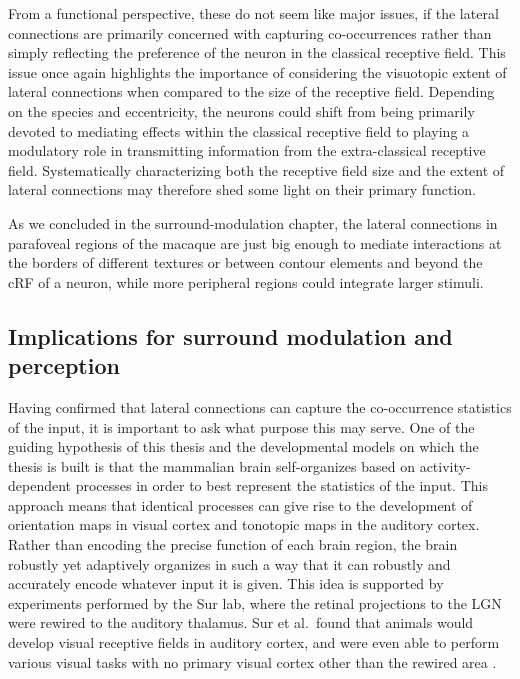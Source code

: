 From a functional perspective, these do not seem like major issues,
if the lateral connections are primarily concerned
with capturing co-occurrences rather than simply reflecting the
preference of the neuron in the classical receptive field. This issue once
again highlights the importance of considering the visuotopic extent of
lateral connections when compared to the size of the receptive
field. Depending on the species and eccentricity, the neurons could
shift from being primarily devoted to mediating effects within the
classical receptive field to playing a modulatory role in transmitting
information from the extra-classical receptive field. Systematically
characterizing both the receptive field size and the extent of lateral
connections may therefore shed some light on their primary function.

As we concluded in the surround-modulation chapter, the lateral
connections in parafoveal regions of the macaque are just big enough
to mediate interactions at the borders of different textures or
between contour elements and beyond the cRF of a neuron, while more
peripheral regions could integrate larger stimuli.

\subsection{Implications for surround modulation and perception}

Having confirmed that lateral connections can capture the
co-occurrence statistics of the input, it is important to ask what
purpose this may serve. One of the guiding hypothesis of this thesis
and the developmental models on which the thesis is built is that the
mammalian brain self-organizes based on activity-dependent processes
in order to best represent the statistics of the input. This approach
means that identical processes can give rise to the development of
orientation maps in visual cortex and tonotopic maps in the auditory
cortex. Rather than encoding the precise function of each brain
region, the brain robustly yet adaptively organizes in such a way that
it can robustly and accurately encode whatever input it is given. This
idea is supported by experiments performed by the Sur lab, where the
retinal projections to the LGN were rewired to the auditory thalamus.
Sur et al.\ found that animals would develop visual receptive fields
in auditory cortex, and were even able to perform various visual tasks
with no primary visual cortex other than the rewired area
\citep{vonMelchner2000}.

